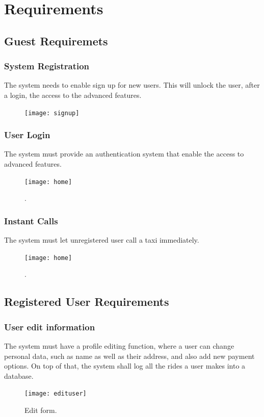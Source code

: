 \section{Requirements}
	\subsection {Guest Requiremets}
		\subsubsection {System Registration}
			The system needs to enable sign up for new users. This will unlock the user, after a login, the access to the advanced features.
			\begin {figure}[h!]
				\texttt{[image: signup]}
				\caption {\askpippo}
			\end {figure}
			\newpage
		\subsubsection {User Login}
		 	The system must provide an authentication system that enable the access to advanced features.
		 	\begin{figure}[h!]
				\texttt{[image: home]}
				\caption{\askpippo.}
			\end{figure}
			\newpage
		\subsubsection {Instant Calls}
			The system must let unregistered user call a taxi immediately.
			\begin{figure}[h!]
				\texttt{[image: home]}
				\caption{\askpippo.}
			\end{figure}
			\newpage
	\subsection {Registered User Requirements}
		\subsubsection {User edit information}
			The system must have a profile editing function, where a user can change personal data, such as name as well as their address,
			and also add new payment options. On top of that, the system shall log all the rides a user makes into a database.
			\begin{figure}[h!]
				\texttt{[image: edituser]}
				\caption{Edit form.}
			\end{figure}
			\newpage
